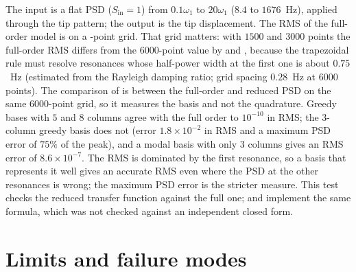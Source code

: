 The input is a flat PSD ($S_{\mathrm{in}}=1$) from $0.1\omega_1$ to $20\omega_1$ ($8.4$ to $1676$~Hz), applied through the tip pattern; the output is the tip displacement. The RMS of the full-order model is \cfrRvSig{} on a \cfrRvNPts{}-point grid. That grid matters: with $1500$ and $3000$ points the full-order RMS differs from the $6000$-point value by \cfrRvGridA and \cfrRvGridB, because the trapezoidal rule must resolve resonances whose half-power width at the first one is about $0.75$~Hz (estimated from the Rayleigh damping ratio; grid spacing $0.28$~Hz at $6000$ points). The comparison of  is between the full-order and reduced PSD on the same $6000$-point grid, so it measures the basis and not the quadrature. Greedy bases with $5$ and $8$ columns agree with the full order to $10^{-10}$ in RMS; the $3$-column greedy basis does not (error $1.8\times10^{-2}$ in RMS and a maximum PSD error of $75\%$ of the peak), and a modal basis with only $3$ columns gives an RMS error of $8.6\times10^{-7}$. The RMS is dominated by the first resonance, so a basis that represents it well gives an accurate RMS even where the PSD at the other resonances is wrong; the maximum PSD error is the stricter measure. This test checks the reduced transfer function against the full one;  and  implement the same formula, which was not checked against an independent closed form.

\begin{table}[ht]
\centering\small

\caption{Random-vibration response of reduced models against the full-order result on the same $6000$-point grid: relative RMS error and the largest PSD error relative to the peak PSD.}\label{tab:fr-psd}
\end{table}

\section{Limits and failure modes}\label{sec:fr-limits}

